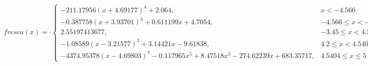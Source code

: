 \documentclass[preview]{standalone}
\begin{document}
\begin{align*}
fresca(x) = \cdot \begin{cases}-211.17956(x + 4.69177)^4 + 2.064, & x < -4.566 \\-0.387758(x + 3.93701)^3 + 0.611199x + 4.7054, & -4.566 \leq x < -3.45 \\2.55197413677, & -3.45 \leq x < 4.2 \\-1.08589(x - 3.21577)^3 + 3.14421x - 9.61838, & 4.2 \leq x < 4.5404 \\-4374.95378(x - 4.69803)^7 - 0.117965x^5 + 8.47518x^3 - 274.62239x + 683.35717, & 4.5404 \leq x \leq 5\end{cases}
\end{align*}
\end{document}
